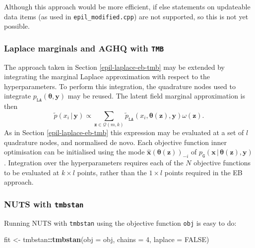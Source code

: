 \documentclass[a4paper, nobind]{templates/ociamthesis}
\newenvironment{Shaded}{\begin{snugshade}}{\end{snugshade}}
\newcommand{\AttributeTok}[1]{\textcolor[rgb]{0.13,0.29,0.53}{#1}}
\newcommand{\ConstantTok}[1]{\textcolor[rgb]{0.56,0.35,0.01}{#1}}
\newcommand{\DecValTok}[1]{\textcolor[rgb]{0.00,0.00,0.81}{#1}}
\newcommand{\FunctionTok}[1]{\textcolor[rgb]{0.13,0.29,0.53}{\textbf{#1}}}
\newcommand{\NormalTok}[1]{#1}
\newcommand{\OtherTok}[1]{\textcolor[rgb]{0.56,0.35,0.01}{#1}}
\newcommand{\SpecialCharTok}[1]{\textcolor[rgb]{0.81,0.36,0.00}{\textbf{#1}}}
\renewenvironment{Shaded}
{
  \vspace{10pt}%
  \begin{snugshade}%
}{%
  \end{snugshade}%
  \vspace{8pt}%
}
\begin{document}
Although this approach would be more efficient, if else statements on updateable data items (as used in \texttt{epil\_modified.cpp}) are not supported, so this is not yet possible.

\hypertarget{epil-laplace-aghq-tmb}{%
\subsubsection{\texorpdfstring{Laplace marginals and AGHQ with \texttt{TMB}}{Laplace marginals and AGHQ with TMB}}\label{epil-laplace-aghq-tmb}}

The approach taken in Section \ref{epil-laplace-eb-tmb} may be extended by integrating the marginal Laplace approximation with respect to the hyperparameters.
To perform this integration, the quadrature nodes used to integrate \(p_\texttt{LA}({\boldsymbol{\mathbf{\theta}}}, \mathbf{y})\) may be reused.
The latent field marginal approximation is then
\begin{equation}
\tilde p(x_i \, | \, \mathbf{y}) \propto \sum_{\mathbf{z} \in \mathcal{Q}(m, k)} \tilde p_\texttt{LA}(x_i, \boldsymbol{\mathbf{\theta}}(\mathbf{z}), \mathbf{y}) \omega(\mathbf{z}).
\end{equation}
As in Section \ref{epil-laplace-eb-tmb} this expression may be evaluated at a set of \(l\) quadrature nodes, and normalised de novo.
Each objective function inner optimisation can be initialised using the mode \(\hat{\mathbf{x}}(\boldsymbol{\mathbf{\theta}}(\mathbf{z}))_{-i}\) of \(p_\texttt{G}(\mathbf{x} \, | \, \boldsymbol{\mathbf{\theta}}(\mathbf{z}), \mathbf{y})\).
Integration over the hyperparameters requires each of the \(N\) objective functions to be evaluated at \(k \times l\) points, rather than the \(1 \times l\) points required in the EB approach.

\hypertarget{epil-nuts}{%
\subsubsection{\texorpdfstring{NUTS with \texttt{tmbstan}}{NUTS with tmbstan}}\label{epil-nuts}}

Running NUTS with \texttt{tmbstan} using the objective function \texttt{obj} is easy to do:

\begin{Shaded}
\begin{Highlighting}[]
\NormalTok{fit }\OtherTok{\textless{}{-}}\NormalTok{ tmbstan}\SpecialCharTok{::}\FunctionTok{tmbstan}\NormalTok{(}\AttributeTok{obj =}\NormalTok{ obj, }\AttributeTok{chains =} \DecValTok{4}\NormalTok{, }\AttributeTok{laplace =} \ConstantTok{FALSE}\NormalTok{)}
\end{Highlighting}
\end{Shaded}
\end{document}

